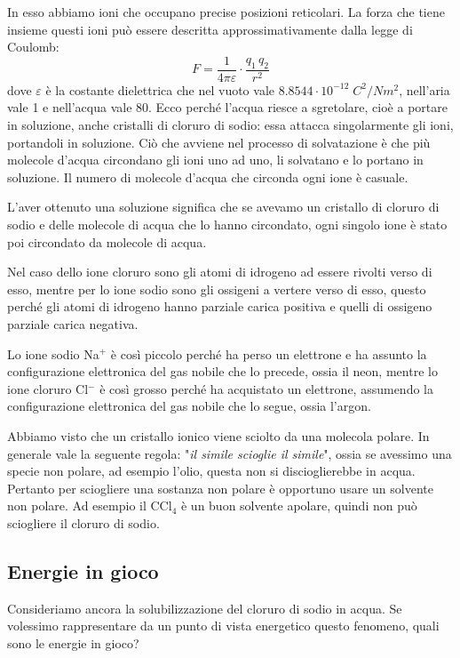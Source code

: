 In esso abbiamo ioni che occupano precise posizioni reticolari. La forza che tiene insieme questi ioni può essere descritta approssimativamente dalla legge di Coulomb:
$$\displaystyle F= \frac{1}{4 \pi \varepsilon} \cdot \frac{q_1 \, q_2}{r^2}$$
dove $\varepsilon$ è la costante dielettrica che nel vuoto vale $8.8544 \cdot 10^{-12}\;C^2/Nm^2$, nell'aria vale 1 e nell'acqua vale 80. Ecco perché l'acqua riesce a sgretolare, cioè a portare in soluzione, anche cristalli di cloruro di sodio: essa attacca singolarmente gli ioni, portandoli in soluzione. Ciò che avviene nel processo di solvatazione è che più molecole d'acqua circondano gli ioni uno ad uno, li solvatano e lo portano in soluzione. Il numero di molecole d'acqua che circonda ogni ione è casuale.

L'aver ottenuto una soluzione significa che se avevamo un cristallo di cloruro di sodio e delle molecole di acqua che lo hanno circondato, ogni singolo ione è stato poi circondato da molecole di acqua.

Nel caso dello ione cloruro sono gli atomi di idrogeno ad essere rivolti verso di esso, mentre per lo ione sodio sono gli ossigeni a vertere verso di esso, questo perché gli atomi di idrogeno hanno parziale carica positiva e quelli di ossigeno parziale carica negativa.

Lo ione sodio Na$^+$ è così piccolo perché ha perso un elettrone e ha assunto la configurazione elettronica del gas nobile che lo precede, ossia il neon, mentre lo ione cloruro Cl$^-$ è così grosso perché ha acquistato un elettrone, assumendo la configurazione elettronica del gas nobile che lo segue, ossia l'argon.

\vspace{0.2cm}Abbiamo visto che un cristallo ionico viene sciolto da una molecola polare. In generale vale la seguente regola: "\textit{il simile scioglie il simile}", ossia se avessimo una specie non polare, ad esempio l'olio, questa non si discioglierebbe in acqua. Pertanto per sciogliere una sostanza non polare è opportuno usare un solvente non polare. Ad esempio il CCl$_4$ è un buon solvente apolare, quindi non può sciogliere il cloruro di sodio.

\subsection{Energie in gioco}

Consideriamo ancora la solubilizzazione del cloruro di sodio in acqua. Se volessimo rappresentare da un punto di vista energetico questo fenomeno, quali sono le energie in gioco?

